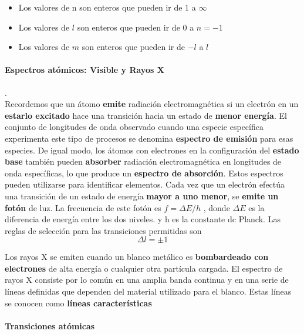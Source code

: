 \documentclass[10pt]{article}
\begin{document}
\begin{itemize}
	\item Los valores de n son enteros que pueden ir de 1 a $\infty$
	\item Los valores de $l$ son enteros que pueden ir de 0 a $n = -1$
	\item Los valores de $m$ son enteros que pueden ir de $-l $ a $l$
\end{itemize}

\paragraph{Espectros atómicos: Visible y Rayos X}.\\

Recordemos que un átomo \textbf{emite} radiación electromagnética si un electrón en un \textbf{estarlo excitado} hace una transición hacia un estado de \textbf{menor energía}. El conjunto de longitudes de onda observado cuando una especie específica experimenta este tipo de procesos se denomina \textbf{espectro de emisión} para esas especies. De igual modo, los átomos con electrones en la configuración del \textbf{estado base} también pueden \textbf{absorber} radiación electromagnética en longitudes de onda específicas, lo que produce un \textbf{espectro de absorción}. Estos espectros pueden utilizarse para identificar elementos. Cada vez que un electrón efectúa una transición de un estado de energía \textbf{mayor a
uno menor}, se \textbf{emite un fotón} de luz. La frecuencia de este fotón es $f = \Delta E/h$ , donde $\Delta E$ es la diferencia de energía entre los dos niveles. y h es la constante dc Planck. Las reglas de selección para las transiciones permitidas son
\begin{equation*}
	\Delta l = \pm 1
\end{equation*}

Los rayos X se emiten cuando un blanco metálico es \textbf{bombardeado con electrones} de alta energía o cualquier otra partícula cargada. El espectro de rayos X consiste por lo común en una amplia banda continua y en una serie de líneas definidas que dependen del material utilizado para el blanco. Estas líneas se conocen como \textbf{líneas características}

\paragraph{Transiciones atómicas}
\end{document}
